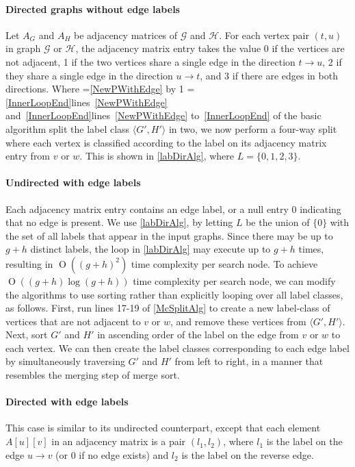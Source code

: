 \documentclass[letterpaper]{article}
\newcommand{\graphG}{\mathcal{G}}
\newcommand{\graphH}{\mathcal{H}}
\newcommand{\setG}{G}
\newcommand{\setH}{H}
\newcommand{\linerangeref}[2]{\count255=\ref{#1}\advance\count255 by 1 \ifnum\count255=\ref{#2}lines~\ref{#1} and~\ref{#2}\else lines~\ref{#1} to~\ref{#2}\fi}
\newcommand{\BigO}[1]{\ensuremath{\operatorname{O}\left(#1\right)}}
\begin{document}
\paragraph{Directed graphs without edge labels} Let $A_G$ and $A_H$ be
adjacency matrices of $\graphG$ and $\graphH$. For each vertex pair $(t,u)$ in graph $\graphG$ or
$\graphH$, the adjacency matrix entry takes the value 0 if the vertices are not
adjacent, 1 if the two vertices share a single edge in the direction $t
\rightarrow u$, 2 if they share a single edge in the direction $u \rightarrow
t$, and 3 if there are edges in both directions. Where
\linerangeref{NewPWithEdge}{InnerLoopEnd} of the basic algorithm split the
label class $\langle \setG',\setH' \rangle$ in two, we now perform a four-way split
where each vertex is classified according to the label on its adjacency matrix
entry from $v$ or $w$.  This is shown in \cref{labDirAlg}, where
$L=\{0,1,2,3\}$.

\paragraph{Undirected with edge labels} Each adjacency matrix entry contains an
edge label, or a null entry $0$ indicating that no edge is present.  We use \cref{labDirAlg}, by
letting $L$ be the union of $\{0\}$ with the set of all labels that appear in
the input graphs. Since there may be up to $g + h$ distinct labels, the loop in
\cref{labDirAlg} may execute up to $g + h$ times, resulting in $\BigO{(g+h)^2}$
time complexity per search node.  To achieve $\BigO{(g+h) \log (g+h)}$ time
complexity per search node, we can modify the algorithms to use sorting rather
than explicitly looping over all label classes, as follows.  First, run lines
17-19 of \cref{McSplitAlg} to create a new label-class of vertices that are
not adjacent to $v$ or $w$, and remove these vertices from $\langle \setG',\setH'
\rangle$.  Next, sort $\setG'$ and $\setH'$ in ascending order of the label on the edge
from $v$ or $w$ to each vertex. We can then create the label classes
corresponding to each edge label by simultaneously traversing $\setG'$ and $\setH'$
from left to right, in a manner that resembles the merging step of merge sort.

\paragraph{Directed with edge labels} This case is similar to its undirected
counterpart, except that each element $A[u][v]$ in an adjacency matrix is a
pair $(l_1, l_2)$, where $l_1$ is the label on the edge $u \rightarrow v$ (or 0
if no edge exists) and $l_2$ is the label on the reverse edge.
\end{document}
